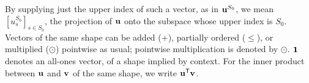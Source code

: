 \documentclass[twoside]{article}
\newcommand\discard[1]{}
\begin{document}
{    %
    By supplying just the upper index of such a vector, as in $\mathbf{u}^{S_0}$,
    we mean $[u^{S_0}_s]_{s \in {S_0}}$, the projection of $\mathbf{u}$ onto the subspace whose upper index is $S_0$.
}
Vectors of the same shape
can be added (+), partially ordered ($\le$), or multiplied ($\odot$) pointwise as usual; pointwise multiplication is denoted by $\odot$.
$\mathbf{1}$ denotes an all-ones vector, of a shape implied by context.
For the inner product between $\mathbf{u}$ and $\mathbf{v}$ of the same shape, we write $\mathbf{u}^{\sf T} \mathbf{v}$.
\discard{\color{gray!30!white} If $\mat u = [u_a]_{a \in A}$ is a vector over $A$ and $\mat v = [v_b]_{b \in B}$ is a vector over $B$, then $\mat u \mathbin{\otimes} \mat v := [ u_a \cdot v_b ]_{a \in A, b \in B}$ is a vector over $A \times B$. }

\end{document}
